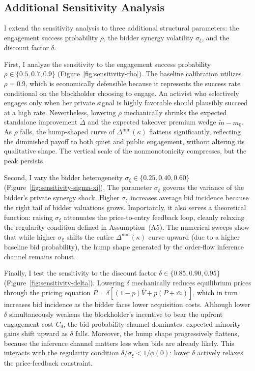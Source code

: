 \documentclass[11pt]{article}
\newcommand{\1}{\mathbf{1}}
\begin{document}
%
\subsection{Additional Sensitivity Analysis}
%

I extend the sensitivity analysis to three additional structural parameters: the engagement success probability $\rho$, the bidder synergy volatility $\sigma_\xi$, and the discount factor $\delta$.

First, I analyze the sensitivity to the engagement success probability $\rho \in \{0.5, 0.7, 0.9\}$ (Figure~\ref{fig:sensitivity-rho}). The baseline calibration utilizes $\rho = 0.9$, which is economically defensible because it represents the success rate conditional on the blockholder choosing to engage. An activist who selectively engages only when her private signal is highly favorable should plausibly succeed at a high rate. Nevertheless, lowering $\rho$ mechanically shrinks the expected standalone improvement $\tilde{\Delta}$ and the expected takeover premium wedge $\tilde{m} - m_0$. As $\rho$ falls, the hump-shaped curve of $\Delta^{\min}(\kappa)$ flattens significantly, reflecting the diminished payoff to both quiet and public engagement, without altering its qualitative shape. The vertical scale of the nonmonotonicity compresses, but the peak persists.

Second, I vary the bidder heterogeneity $\sigma_\xi \in \{0.25, 0.40, 0.60\}$ (Figure~\ref{fig:sensitivity-sigma-xi}). The parameter $\sigma_\xi$ governs the variance of the bidder's private synergy shock. Higher $\sigma_\xi$ increases average bid incidence because the right tail of bidder valuations grows. Importantly, it also serves a theoretical function: raising $\sigma_\xi$ attenuates the price-to-entry feedback loop, cleanly relaxing the regularity condition defined in Assumption~\textup{(A5)}. The numerical sweeps show that while higher $\sigma_\xi$ shifts the entire $\Delta^{\min}(\kappa)$ curve upward (due to a higher baseline bid probability), the hump shape generated by the order-flow inference channel remains robust.

Finally, I test the sensitivity to the discount factor $\delta \in \{0.85, 0.90, 0.95\}$ (Figure~\ref{fig:sensitivity-delta}). Lowering $\delta$ mechanically reduces equilibrium prices through the pricing equation $P = \delta[(1-p)\hat{V} + p(P + \bar{m})]$, which in turn increases bid incidence as the bidder faces lower acquisition costs. Although lower $\delta$ simultaneously weakens the blockholder's incentive to bear the upfront engagement cost $C_0$, the bid-probability channel dominates: expected minority gains shift upward as $\delta$ falls. Moreover, the hump shape progressively flattens, because the inference channel matters less when bids are already likely. This interacts with the regularity condition $\delta/\sigma_\xi < 1/\phi(0)$: lower $\delta$ actively relaxes the price-feedback constraint.
\end{document}
